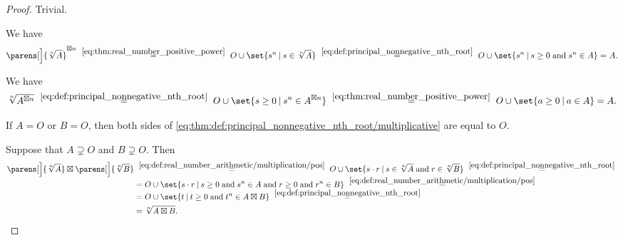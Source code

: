 \begin{proof}
   Trivial.

   We have
  \begin{equation*}
    \parens[\Big]{ \sqrt[n]{ A } }^{\boxtimes n}
    \reloset{\eqref{eq:thm:real_number_positive_power}} =
    O \cup \set{ s^n \given s \in \sqrt[n]{ A } }
    \reloset{\eqref{eq:def:principal_nonnegative_nth_root}} =
    O \cup \set{ s^n \given s \geq 0 \T{and} s^n \in A }
    =
    A.
  \end{equation*}

   We have
  \begin{equation*}
    \sqrt[n]{ A^{\boxtimes n} }
    \reloset{\eqref{eq:def:principal_nonnegative_nth_root}} =
    O \cup \set{ s \geq 0 \given s^n \in A^{\boxtimes n} }
    \reloset{\eqref{eq:thm:real_number_positive_power}} =
    O \cup \set{ a \geq 0 \given a \in A }
    =
    A.
  \end{equation*}

   If \( A = O \) or \( B = O \), then both sides of \eqref{eq:thm:def:principal_nonnegative_nth_root/multiplicative} are equal to \( O \).

  Suppose that \( A \supsetneq O \) and \( B \supsetneq O \). Then
  \begin{align*}
    \parens[\Big]{\sqrt[n]{ A }} \boxtimes \parens[\Big]{\sqrt[n]{ B }}
    &\reloset {\eqref{eq:def:real_number_arithmetic/multiplication/pos}} =
    O \cup \set{ s \cdot r \given s \in \sqrt[n]{ A } \T{and} r \in \sqrt[n]{ B }}
    \reloset {\eqref{eq:def:principal_nonnegative_nth_root}} = \\ &=
    O \cup \set{ s \cdot r \given s \geq 0 \T{and} s^n \in A \T{and} r \geq 0 \T{and} r^n \in B }
    \reloset {\eqref{eq:def:real_number_arithmetic/multiplication/pos}} = \\ &=
    O \cup \set{ t \given t \geq 0 \T{and} t^n \in A \boxtimes B }
    \reloset {\eqref{eq:def:principal_nonnegative_nth_root}} = \\ &=
    \sqrt[n]{ A \boxtimes B }.
  \end{align*}
\end{proof}

